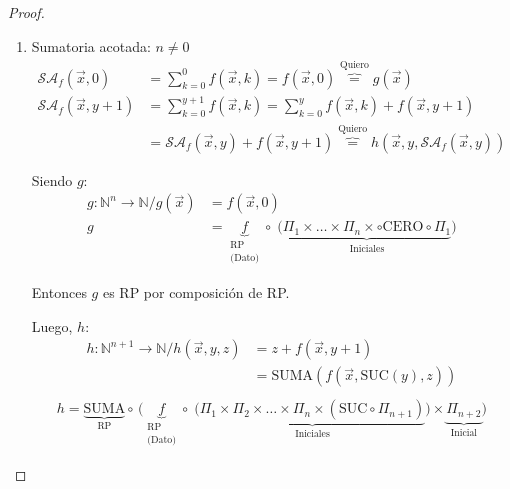 \begin{proof} \phantom{.}
    \begin{enumerate}
        \item Sumatoria acotada: $n \neq 0$
            \begin{align*}
                \mathcal{SA}_f (\overrightarrow{x},0) &= \sum_{k=0}^0 f(
                \overrightarrow{x},k) = f(\overrightarrow{x}, 0)
                \overbrace{=}^{\text{Quiero}} g(\overrightarrow{x}) \\
                \mathcal{SA}_f (\overrightarrow{x},y+1) &= \sum_{k=0}^{y+1} f(
                \overrightarrow{x},k) = \sum_{k=0}^{y} f(
                \overrightarrow{x},k) + f(\overrightarrow{x}, y+1) \\
                &= \mathcal{SA}_f (\overrightarrow{x},y) + 
                f(\overrightarrow{x}, y+1) \overbrace{=}^{\text{Quiero}}
                h(\overrightarrow{x}, y, \mathcal{SA}_f(\overrightarrow{x},y))
            \end{align*}

            Siendo $g$:
            \begin{align*}
                g: \mathbb{N}^n \to \mathbb{N} / g(\overrightarrow{x}) &=
                f(\overrightarrow{x}, 0) \\
                g &= \underbrace{f}_{\substack{\text{RP}\\ \text{(Dato)}}}
                \circ \;
                \big(\underbrace{\Pi_1 \times \dots \times \Pi_n \times \circ 
                \mathrm{CERO} \circ \Pi_1}_{\text{Iniciales}} \big)
            \end{align*}

            Entonces $g$ es RP por composición de RP.

            Luego, $h$:
            \begin{align*}
                h: \mathbb{N}^{n+1} \to \mathbb{N} / h(\overrightarrow{x},y,z)
                &= z + f(\overrightarrow{x},y+1) \\
                &= \mathrm{SUMA}(f(\overrightarrow{x}, \mathrm{SUC}(y),z))\\
            \end{align*}
            \begin{gather*}
                h = \underbrace{\mathrm{SUMA}}_{\text{RP}} \circ \,
                \Big( \underbrace{f}_{\substack{\text{RP}\\ \text{(Dato)}}} 
                \circ \;
                \big( \underbrace{\Pi_1 \times \Pi_2 \times \dots \times 
                \Pi_n \times 
                (\mathrm{SUC} \circ \Pi_{n+1})}_{\text{Iniciales}} \big)
                \times \underbrace{\Pi_{n+2}}_{\text{Inicial}} \Big) 
            \end{gather*}


\end{enumerate}
\end{proof}
